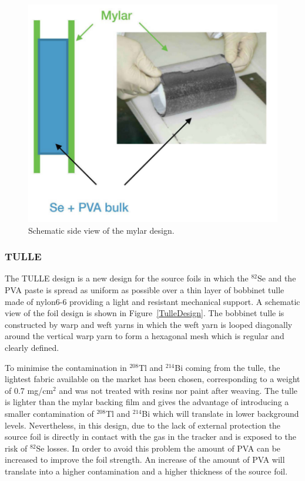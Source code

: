 \documentclass[main.tex]{subfiles}
\begin{document}
\begin{figure}[h!]
\centering
\includegraphics[scale=0.2]{pictures/Chap4/MylarDesign.png}
\caption{Schematic side view of the mylar design.}
\label{MylarDesign}
\end{figure}


\FloatBarrier


\subsubsection{TULLE}


\NI The TULLE design is a new design for the source foils in which the $^{\text{82}}$Se and the PVA paste is spread as uniform as possible over a thin layer of bobbinet tulle made of nylon6-6 providing a light and resistant mechanical support. A schematic view of the foil design is shown in Figure~\ref{TulleDesign}. The bobbinet tulle is constructed by warp and weft yarns in which the weft yarn is looped diagonally around the vertical warp yarn to form a hexagonal mesh which is regular and clearly defined.


\bigskip


\NI To minimise the contamination in $^{\text{208}}$Tl and $^{\text{214}}$Bi coming from the tulle, the lightest fabric available on the market has been chosen, corresponding to a weight of 0.7 mg/cm$^\text{2}$ and was not treated with resins nor paint after weaving. The tulle is lighter than the mylar backing film and gives the advantage of introducing a smaller contamination of $^{\text{208}}$Tl and $^{\text{214}}$Bi which will translate in lower background levels. Nevertheless, in this design, due to the lack of external protection the source foil is directly in contact with the gas in the tracker and is exposed to the risk of $^{\text{82}}$Se losses. In order to avoid this problem the amount of PVA can be increased to improve the foil strength. An increase of the amount of PVA will translate into a higher contamination and a higher thickness of the source foil. 
\end{document}
